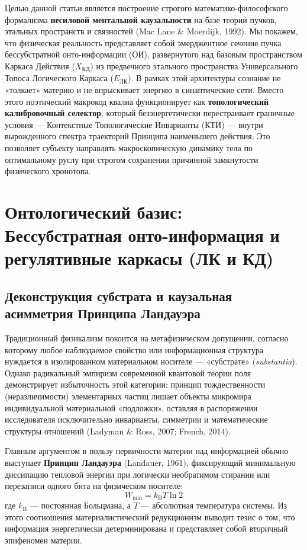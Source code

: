 \documentclass[12pt,a4paper]{article}
\begin{document}
Целью данной статьи является построение строгого математико-философского формализма \textbf{несиловой ментальной каузальности} на базе теории пучков, этальных пространств и связностей (Mac Lane \& Moerdijk, 1992). Мы покажем, что физическая реальность представляет собой эмерджентное сечение пучка бессубстратной онто-информации (ОИ), развернутого над базовым пространством Каркаса Действия ($X_{\text{КД}}$) из предвечного этального пространства Универсального Топоса Логического Каркаса ($E_{\text{ЛК}}$). В рамках этой архитектуры сознание не «толкает» материю и не впрыскивает энергию в синаптические сети. Вместо этого ноэтический макрокод квалиа функционирует как \textbf{топологический калибровочный селектор}, который безэнергетически перестраивает граничные условия --- Контекстные Топологические Инварианты (КТИ) --- внутри вырожденного спектра траекторий Принципа наименьшего действия. Это позволяет субъекту направлять макроскопическую динамику тела по оптимальному руслу при строгом сохранении причинной замкнутости физического хронотопа.

\section{Онтологический базис: Бессубстратная онто-информация и регулятивные каркасы (ЛК и КД)}

\subsection{Деконструкция субстрата и каузальная асимметрия Принципа Ландауэра}
Традиционный физикализм покоится на метафизическом допущении, согласно которому любое наблюдаемое свойство или информационная структура нуждается в изолированном материальном носителе --- «субстрате» (\textit{substantia}). Однако радикальный эмпиризм современной квантовой теории поля демонстрирует избыточность этой категории: принцип тождественности (неразличимости) элементарных частиц лишает объекты микромира индивидуальной материальной «подложки», оставляя в распоряжении исследователя исключительно инварианты, симметрии и математические структуры отношений (Ladyman \& Ross, 2007; French, 2014).

Главным аргументом в пользу первичности материи над информацией обычно выступает \textbf{Принцип Ландауэра} (Landauer, 1961), фиксирующий минимальную диссипацию тепловой энергии при логически необратимом стирании или перезаписи одного бита на физическом носителе:
\begin{equation}
W_{\min} = k_{\text{B}}T \ln 2
\end{equation}
где $k_{\text{B}}$ --- постоянная Больцмана, а $T$ --- абсолютная температура системы. Из этого соотношения материалистический редукционизм выводит тезис о том, что информация энергетически детерминирована и представляет собой вторичный эпифеномен материи.
\end{document}
